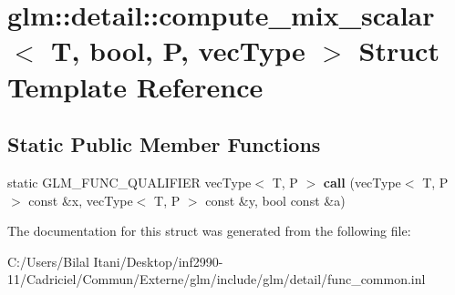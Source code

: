 \hypertarget{structglm_1_1detail_1_1compute__mix__scalar_3_01_t_00_01bool_00_01_p_00_01vec_type_01_4}{}\section{glm\+:\+:detail\+:\+:compute\+\_\+mix\+\_\+scalar$<$ T, bool, P, vec\+Type $>$ Struct Template Reference}
\label{structglm_1_1detail_1_1compute__mix__scalar_3_01_t_00_01bool_00_01_p_00_01vec_type_01_4}
\subsection*{Static Public Member Functions}
\begin{DoxyCompactItemize}
\item 
static G\+L\+M\+\_\+\+F\+U\+N\+C\+\_\+\+Q\+U\+A\+L\+I\+F\+I\+ER vec\+Type$<$ T, P $>$ {\bfseries call} (vec\+Type$<$ T, P $>$ const \&x, vec\+Type$<$ T, P $>$ const \&y, bool const \&a)\hypertarget{structglm_1_1detail_1_1compute__mix__scalar_3_01_t_00_01bool_00_01_p_00_01vec_type_01_4_a32b46dd2110b41d9c7b98fc90b9a88b1}{}\label{structglm_1_1detail_1_1compute__mix__scalar_3_01_t_00_01bool_00_01_p_00_01vec_type_01_4_a32b46dd2110b41d9c7b98fc90b9a88b1}

\end{DoxyCompactItemize}


The documentation for this struct was generated from the following file\+:\begin{DoxyCompactItemize}
\item 
C\+:/\+Users/\+Bilal Itani/\+Desktop/inf2990-\/11/\+Cadriciel/\+Commun/\+Externe/glm/include/glm/detail/func\+\_\+common.\+inl\end{DoxyCompactItemize}
